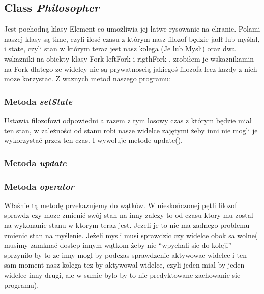 \documentclass[a4paper, 12pt]{report}
\begin{document}
\subsection{Class \emph{Philosopher}}

Jest pochodną klasy Element co umożliwia jej łatwe rysowanie na ekranie. Polami naszej klasy są time, czyli ilosć czasu z którym nasz  filozof będzie jadł lub myślał, i state, czyli stan w którym teraz jest nasz kolega (Je lub Mysli) oraz dwa wskazniki na obiekty klasy Fork leftFork i rigthFork , zrobiłem je wskaznikamin na Fork dlatego ze widelcy nie są prywatnoscią jakiegoś filozofa lecz kazdy z nich moze korzystac. Z waznych metod naszego programu:



\subsubsection{Metoda \emph{setState}}

Ustawia filozofowi odpowiedni a razem z tym losowy czas z którym będzie miał ten stan, w zależności od stanu robi nasze widelce zajętymi żeby inni nie mogli je wykorzystać przez ten czas. I wywoluje metode update().



\subsubsection{Metoda \emph{update}}



\subsubsection{Metoda \emph{operator}}

Właśnie tą metodę przekazujemy do wątków. W nieskończonej pętli filozof sprawdz czy moze zmienić swój stan na inny zalezy to od czasu ktory mu zostal na wykonanie stanu w ktorym teraz jest. Jezeli je to nie ma zadnego problemu zmienic stan na myślenie. Jeżeli mysli musi sprawdzic czy widelce obok sa wolne( musimy zamknać dostep innym wątkom żeby nie ``wpychali sie do koleji'' sprzynilo by to ze inny mogl by podczas sprawdzenie aktywowac widelce i ten sam moment nasz kolega tez by aktywowal widelce, czyli jeden mial by jeden widelec inny drugi, ale w sumie bylo by to nie predyktowane zachowanie sie programu).
\end{document}

